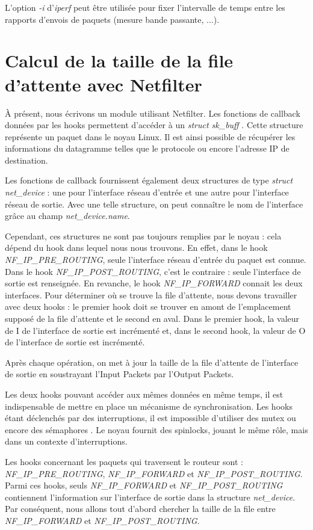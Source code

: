 \documentclass[a4paper]{article}
\begin{document}
L'option \textit{-i} d'\textit{iperf} peut être utilisée
pour fixer l'intervalle de temps entre les rapports
d'envois de paquets (mesure bande passante, $\ldots$).

\section{Calcul de la taille de la file d'attente avec Netfilter}
\`A présent, nous écrivons un module utilisant Netfilter. Les
fonctions de callback données par les hooks permettent
d'accéder à un \textit{struct sk\_buff} \cite{skbuff}. Cette structure représente
un paquet dans le noyau Linux. Il est ainsi possible de récupérer
les informations du datagramme telles que le protocole ou encore
l'adresse IP de destination.

Les fonctions de callback fournissent également deux structures
de type \textit{struct net\_device} : une pour l'interface réseau
d'entrée et une autre pour l'interface réseau de sortie. Avec
une telle structure, on peut connaître le nom de l'interface
grâce au champ \textit{net\_device.name}.

Cependant, ces structures ne sont pas toujours remplies par le noyau : cela 
dépend du hook dans lequel nous nous trouvons. En effet, dans le hook \textit{NF\_IP\_PRE\_ROUTING}, 
seule l'interface réseau d'entrée du paquet est connue. Dans le hook \textit{NF\_IP\_POST\_ROUTING}, 
c'est le contraire : seule l'interface de sortie est renseignée. En revanche, le hook \textit{NF\_IP\_FORWARD} 
connait les deux interfaces.
Pour déterminer où se trouve la file d'attente, nous devons travailler avec deux hooks : 
le premier hook doit se trouver en amont de l'emplacement supposé de la file d'attente et le second en aval. 
Dans le premier hook, la valeur de I de l'interface de sortie est incrémenté et, dans le second hook, 
la valeur de O de l'interface de sortie est incrémenté.
 
Après chaque opération, on met à jour la taille de la file
d'attente de l'interface de sortie en soustrayant l'Input Packets par l'Output Packets.

Les deux hooks pouvant accéder aux mêmes données en même temps,
il est indispensable de mettre en place un mécanisme de
synchronisation. Les hooks étant déclenchés par des interruptions,
il est impossible d'utiliser des mutex ou encore des sémaphores \cite{mutex}.
Le noyau fournit des spinlocks, jouant le même rôle, mais dans
un contexte d'interruptions. \cite{lock}

Les hooks concernant les paquets qui traversent le routeur sont :
\textit{NF\_IP\_PRE\_ROUTING}, \textit{NF\_IP\_FORWARD} et
\textit{NF\_IP\_POST\_ROUTING}. Parmi ces hooks, seuls
\textit{NF\_IP\_FORWARD} et \textit{NF\_IP\_POST\_ROUTING}
contiennent l'information sur l'interface de sortie dans la
structure \textit{net\_device}. Par conséquent, nous allons
tout d'abord chercher la taille de la file entre
\textit{NF\_IP\_FORWARD} et \textit{NF\_IP\_POST\_ROUTING}.
\end{document}

